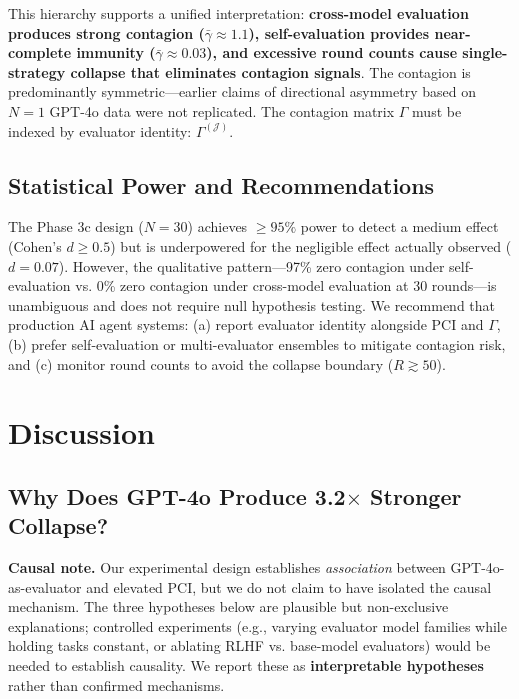 \documentclass[11pt,a4paper]{article}
\begin{document}
This hierarchy supports a unified interpretation: \textbf{cross-model evaluation produces strong contagion ($\bar{\gamma} \approx 1.1$), self-evaluation provides near-complete immunity ($\bar{\gamma} \approx 0.03$), and excessive round counts cause single-strategy collapse that eliminates contagion signals}. The contagion is predominantly symmetric---earlier claims of directional asymmetry based on $N=1$ GPT-4o data were not replicated. The contagion matrix $\Gamma$ must be indexed by evaluator identity: $\Gamma^{(\mathcal{J})}$.

\subsection{Statistical Power and Recommendations}

The Phase 3c design ($N=30$) achieves $\geq 95\%$ power to detect a medium effect (Cohen's $d \geq 0.5$) but is underpowered for the negligible effect actually observed ($d=0.07$). However, the qualitative pattern---97\% zero contagion under self-evaluation vs. 0\% zero contagion under cross-model evaluation at 30 rounds---is unambiguous and does not require null hypothesis testing. We recommend that production AI agent systems: (a) report evaluator identity alongside PCI and $\Gamma$, (b) prefer self-evaluation or multi-evaluator ensembles to mitigate contagion risk, and (c) monitor round counts to avoid the collapse boundary ($R \gtrsim 50$).



\section{Discussion}

\subsection{Why Does GPT-4o Produce 3.2$\times$ Stronger Collapse?}

\noindent\textbf{Causal note.} Our experimental design establishes \textit{association} between GPT-4o-as-evaluator and elevated PCI, but we do not claim to have isolated the causal mechanism. The three hypotheses below are plausible but non-exclusive explanations; controlled experiments (e.g., varying evaluator model families while holding tasks constant, or ablating RLHF vs. base-model evaluators) would be needed to establish causality. We report these as \textbf{interpretable hypotheses} rather than confirmed mechanisms.
\end{document}
